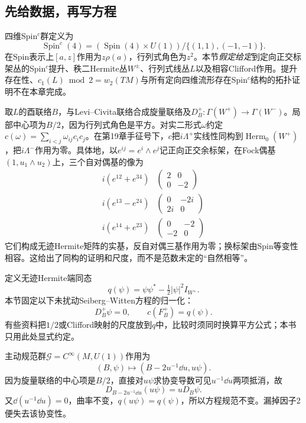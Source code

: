 \subsection{先给数据，再写方程}
四维Spin$^c$群定义为
\[
 \operatorname{Spin}^c(4)=(\operatorname{Spin}(4)\times U(1))/\{(1,1),(-1,-1)\}.
\]
在Spin表示上$[a,z]$作用为$z\rho(a)$，行列式角色为$z^2$。本节\emph{假定给定}到定向正交标架丛的Spin$^c$提升、秩二Hermite丛$W^\pm$、行列式线丛$L$以及相容Clifford作用。提升存在性、$c_1(L)\bmod2=w_2(TM)$与所有定向四维流形存在Spin$^c$结构的拓扑证明不在本章完成。

取$L$的酉联络$B$，与Levi--Civita联络合成旋量联络及$D_B^+:\Gamma(W^+)\to\Gamma(W^-)$。局部中心项为$B/2$，因为行列式角色是平方。对实二形式$\omega$约定$c(\omega)=\sum_{i<j}\omega_{ij}c_ic_j$。在第19章手征号下，$c$把$i\Lambda^+$实线性同构到$\operatorname{Herm}_0(W^+)$，把$i\Lambda^-$作用为零。具体地，以$e^{ij}=e^i\wedge e^j$记正向正交余标架，在Fock偶基$(1,u_1\wedge u_2)$上，三个自对偶基的像为
\[
 \begin{array}{c|c}
 i(e^{12}+e^{34})&\left(\begin{smallmatrix}2&0\\0&-2\end{smallmatrix}\right)\\
 i(e^{13}-e^{24})&\left(\begin{smallmatrix}0&-2i\\2i&0\end{smallmatrix}\right)\\
 i(e^{14}+e^{23})&\left(\begin{smallmatrix}0&-2\\-2&0\end{smallmatrix}\right)
 \end{array}
\]
它们构成无迹Hermite矩阵的实基，反自对偶三基作用为零；换标架由Spin等变性相容。这给出了同构的证明和尺度，而不是范数未定的“自然相等”。

定义无迹Hermite端同态
\[
 q(\psi)=\psi\psi^*-\tfrac12|\psi|^2I_{W^+}.
\]
本节固定以下未扰动Seiberg--Witten方程的归一化：
\begin{equation}\label{eq:sw-equations}
 D_B^+\psi=0,\qquad c(F_B^+)=q(\psi).
\end{equation}
有些资料把$1/2$或Clifford映射的尺度放到$q$中，比较时须同时换算平方公式；本书只用此处显式约定。

主动规范群$\mathcal G=C^\infty(M,U(1))$作用为
\begin{equation}\label{eq:sw-gauge}
 (B,\psi)\longmapsto(B-2u^{-1}\dd u,u\psi).
\end{equation}
因为旋量联络的中心项是$B/2$，直接对$u\psi$求协变导数可见$u^{-1}\dd u$两项抵消，故
\[
 D_{B-2u^{-1}\dd u}(u\psi)=uD_B\psi.
\]
又$\dd(u^{-1}\dd u)=0$，曲率不变，$q(u\psi)=q(\psi)$，所以方程规范不变。漏掉因子2便失去该协变性。

